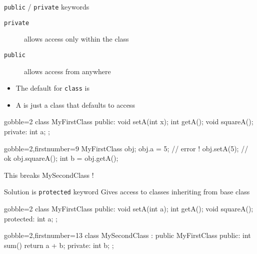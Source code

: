 \begin{frame}[fragile]
  \begin{block}{\texttt{public} / \texttt{private} keywords}
    \begin{description}
      \item[\texttt{private}] allows access only within the class
      \item[\texttt{public}] allows access from anywhere
    \end{description}
    \begin{itemize}
       \item The default for \texttt{class} is 
       \item A  is just a class that defaults to  access
    \end{itemize}
  \end{block}
  \pause
  \begin{multicols}{2}
    \begin{cppcode*}{gobble=2}
      class MyFirstClass {
      public:
        void setA(int x);
        int getA();
        void squareA();
      private:
        int a;
      };
    \end{cppcode*}
    \columnbreak
    \begin{cppcode*}{gobble=2,firstnumber=9}
      MyFirstClass obj;
      obj.a = 5;   // error !
      obj.setA(5); // ok
      obj.squareA();
      int b = obj.getA();
    \end{cppcode*}
    \pause
    \begin{tcolorbox}[left=0mm,right=0mm,top=0mm,bottom=0mm,colback=red!5!white,colframe=red!75!black]
      This breaks MySecondClass !
    \end{tcolorbox}
  \end{multicols}
\end{frame}

\begin{frame}[fragile]
  \begin{block}{Solution is \texttt{protected} keyword}
    Gives access to classes inheriting from base class
  \end{block}
  \begin{multicols}{2}
    \begin{cppcode*}{gobble=2}
      class MyFirstClass {
      public:
        void setA(int a);
        int getA();
        void squareA();
      protected:
        int a;
      };
    \end{cppcode*}
    \columnbreak
    \begin{cppcode*}{gobble=2,firstnumber=13}
      class MySecondClass :
        public MyFirstClass {
      public:
        int sum() {
          return a + b;
        }
      private:
        int b;
      };
    \end{cppcode*}
  \end{multicols}
\end{frame}

